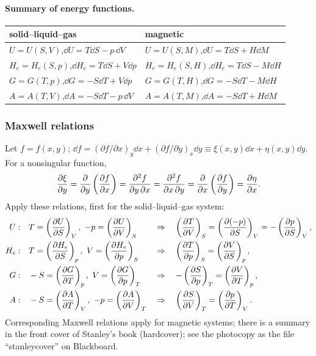 \paragraph{Summary of energy functions.}\leavevmode\par
\begin{center}
\renewcommand{\arraystretch}{1.3}
\begin{tabular}{l|l}
  solid--liquid--gas & magnetic\\ \hline
  $U = U(S,V)$,\quad $\dd U = T\dd S - p\,\dd V$ & $U = U(S,M)$,\quad $\dd U = T\dd S + H\dd M$\\
  $H_e = H_e(S,p)$,\quad $\dd H_e = T\dd S + V\dd p$ & $H_e = H_e(S,H)$,\quad $\dd H_e = T\dd S - M\dd H$\\
  $G = G(T,p)$,\quad $\dd G = -S\dd T + V\dd p$ & $G = G(T,H)$,\quad $\dd G = -S\dd T - M\dd H$\\
  $A = A(T,V)$,\quad $\dd A = -S\dd T - p\,\dd V$ & $A = A(T,M)$,\quad $\dd A = -S\dd T + H\dd M$
\end{tabular}
\end{center}

\subsubsection*{Maxwell relations}

Let $f = f(x,y)$;
$\dd f = (\partial f/\partial x)_y\dd x + (\partial f/\partial y)_x\dd y
\equiv\xi(x,y)\dd x + \eta(x,y)\dd y$. For a nonsingular function,
\begin{equation}
  \frac{\partial \xi}{\partial y} = \frac{\partial }{\partial y}\left(\frac{\partial f}{\partial x}\right) = \frac{\partial^2 f}{\partial y\,\partial x}
  = \frac{\partial^2 f}{\partial x\,\partial y} = \frac{\partial }{\partial x}\left(\frac{\partial f}{\partial y}\right) = \frac{\partial \eta}{\partial x}.
\end{equation}
Apply these relations, first for the solid--liquid--gas system:
\begin{align}
  U:&\quad T = \left(\frac{\partial U}{\partial S}\right)_V,\ -p = \left(\frac{\partial U}{\partial V}\right)_S
     &&\Rightarrow\quad \left(\frac{\partial T}{\partial V}\right)_S = \left(\frac{\partial (-p)}{\partial S}\right)_V = -\left(\frac{\partial p}{\partial S}\right)_V,\\
  H_e:&\quad T = \left(\frac{\partial H_e}{\partial S}\right)_p,\ V = \left(\frac{\partial H_e}{\partial p}\right)_S
     &&\Rightarrow\quad \left(\frac{\partial T}{\partial p}\right)_S = \left(\frac{\partial V}{\partial S}\right)_p,\\
  G:&\quad -S = \left(\frac{\partial G}{\partial T}\right)_p,\ V = \left(\frac{\partial G}{\partial p}\right)_T
     &&\Rightarrow\quad -\left(\frac{\partial S}{\partial p}\right)_T = \left(\frac{\partial V}{\partial T}\right)_p,\\
  A:&\quad -S = \left(\frac{\partial A}{\partial T}\right)_V,\ -p = \left(\frac{\partial A}{\partial V}\right)_T
     &&\Rightarrow\quad \left(\frac{\partial S}{\partial V}\right)_T = \left(\frac{\partial p}{\partial T}\right)_V.
\end{align}
Corresponding Maxwell relations apply for magnetic systems; there is a summary in the
front cover of Stanley's book (hardcover); see the photocopy as the file ``stanleycover''
on Blackboard.

